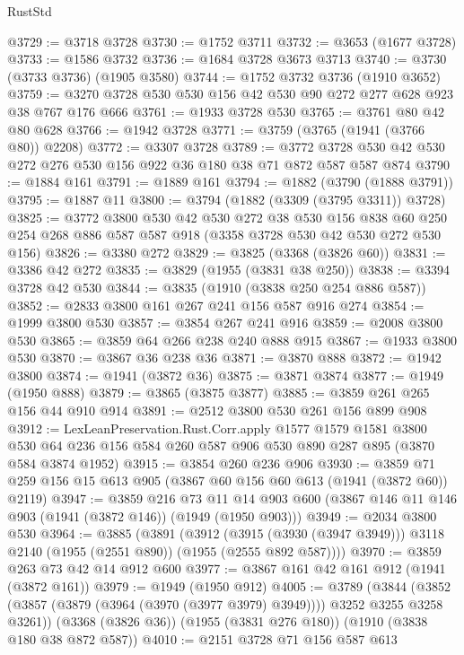 \begin{lexlean}{RustStd}
\begin{coremodule}
@3729 := @3718 @3728
@3730 := @1752 @3711
@3732 := @3653 (@1677 @3728)
@3733 := @1586 @3732
@3736 := @1684 @3728 @3673 @3713
@3740 := @3730 (@3733 @3736) (@1905 @3580)
@3744 := @1752 @3732 @3736 (@1910 @3652)
@3759 := @3270 @3728 @530 @530 @156 @42 @530 @90 @272 @277 @628 @923 @38 @767 @176 @666
@3761 := @1933 @3728 @530
@3765 := @3761 @80 @42 @80 @628
@3766 := @1942 @3728
@3771 := @3759 (@3765 (@1941 (@3766 @80)) @2208)
@3772 := @3307 @3728
@3789 := @3772 @3728 @530 @42 @530 @272 @276 @530 @156 @922 @36 @180 @38 @71 @872 @587 @587 @874
@3790 := @1884 @161
@3791 := @1889 @161
@3794 := @1882 (@3790 (@1888 @3791))
@3795 := @1887 @11
@3800 := @3794 (@1882 (@3309 (@3795 @3311)) @3728)
@3825 := @3772
    @3800
    @530
    @42
    @530
    @272
    @38
    @530
    @156
    @838
    @60
    @250
    @254
    @268
    @886
    @587
    @587
    @918
    (@3358 @3728 @530 @42 @530 @272 @530 @156)
@3826 := @3380 @272
@3829 := @3825 (@3368 (@3826 @60))
@3831 := @3386 @42 @272
@3835 := @3829 (@1955 (@3831 @38 @250))
@3838 := @3394 @3728 @42 @530
@3844 := @3835 (@1910 (@3838 @250 @254 @886 @587))
@3852 := @2833 @3800 @161 @267 @241 @156 @587 @916 @274
@3854 := @1999 @3800 @530
@3857 := @3854 @267 @241 @916
@3859 := @2008 @3800 @530
@3865 := @3859 @64 @266 @238 @240 @888 @915
@3867 := @1933 @3800 @530
@3870 := @3867 @36 @238 @36
@3871 := @3870 @888
@3872 := @1942 @3800
@3874 := @1941 (@3872 @36)
@3875 := @3871 @3874
@3877 := @1949 (@1950 @888)
@3879 := @3865 (@3875 @3877)
@3885 := @3859 @261 @265 @156 @44 @910 @914
@3891 := @2512 @3800 @530 @261 @156 @899 @908
@3912 := LexLeanPreservation.Rust.Corr.apply
    @1577
    @1579
    @1581
    @3800
    @530
    @64
    @236
    @156
    @584
    @260
    @587
    @906
    @530
    @890
    @287
    @895
    (@3870 @584 @3874 @1952)
@3915 := @3854 @260 @236 @906
@3930 := @3859 @71 @259 @156 @15 @613 @905 (@3867 @60 @156 @60 @613 (@1941 (@3872 @60)) @2119)
@3947 := @3859
    @216
    @73
    @11
    @14
    @903
    @600
    (@3867 @146 @11 @146 @903 (@1941 (@3872 @146)) (@1949 (@1950 @903)))
@3949 := @2034 @3800 @530
@3964 := @3885
    (@3891
      (@3912
        (@3915 (@3930 (@3947 @3949)))
        @3118
        @2140
        (@1955 (@2551 @890))
        (@1955 (@2555 @892 @587))))
@3970 := @3859 @263 @73 @42 @14 @912 @600
@3977 := @3867 @161 @42 @161 @912 (@1941 (@3872 @161))
@3979 := @1949 (@1950 @912)
@4005 := @3789
    (@3844 (@3852 (@3857 (@3879 (@3964 (@3970 (@3977 @3979) @3949)))) @3252 @3255 @3258 @3261))
    (@3368 (@3826 @36))
    (@1955 (@3831 @276 @180))
    (@1910 (@3838 @180 @38 @872 @587))
@4010 := @2151 @3728 @71 @156 @587 @613

\end{coremodule}
\end{lexlean}
